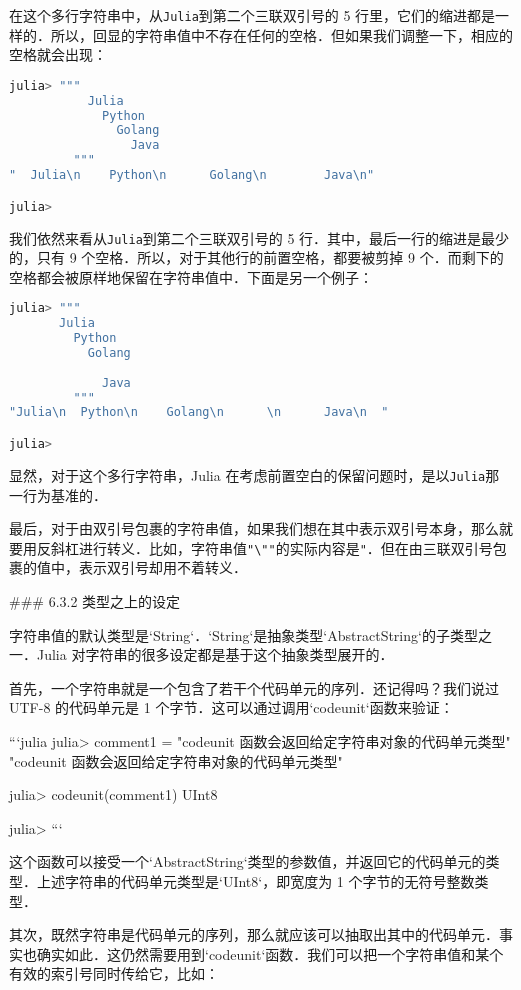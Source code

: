 在这个多行字符串中，从\verb|Julia|到第二个三联双引号的 5 行里，它们的缩进都是一样的．所以，回显的字符串值中不存在任何的空格．但如果我们调整一下，相应的空格就会出现：
\begin{lstlisting}[language=julia]
julia> """
           Julia
             Python
               Golang
                 Java
         """
"  Julia\n    Python\n      Golang\n        Java\n"

julia> 
\end{lstlisting}

我们依然来看从\verb|Julia|到第二个三联双引号的 5 行．其中，最后一行的缩进是最少的，只有 9 个空格．所以，对于其他行的前置空格，都要被剪掉 9 个．而剩下的空格都会被原样地保留在字符串值中．下面是另一个例子：
\begin{lstlisting}[language=julia]
julia> """
       Julia
         Python
           Golang
             
             Java
         """
"Julia\n  Python\n    Golang\n      \n      Java\n  "

julia> 
\end{lstlisting}

显然，对于这个多行字符串，Julia 在考虑前置空白的保留问题时，是以\verb|Julia|那一行为基准的．

最后，对于由双引号包裹的字符串值，如果我们想在其中表示双引号本身，那么就要用反斜杠进行转义．比如，字符串值\verb|"\""|的实际内容是\verb|"|．但在由三联双引号包裹的值中，表示双引号却用不着转义．

### 6.3.2 类型之上的设定

字符串值的默认类型是`String`．`String`是抽象类型`AbstractString`的子类型之一．Julia 对字符串的很多设定都是基于这个抽象类型展开的．

首先，一个字符串就是一个包含了若干个代码单元的序列．还记得吗？我们说过 UTF-8 的代码单元是 1 个字节．这可以通过调用`codeunit`函数来验证：

```julia
julia> comment1 = "codeunit 函数会返回给定字符串对象的代码单元类型"
"codeunit 函数会返回给定字符串对象的代码单元类型"

julia> codeunit(comment1)
UInt8

julia> 
```

这个函数可以接受一个`AbstractString`类型的参数值，并返回它的代码单元的类型．上述字符串的代码单元类型是`UInt8`，即宽度为 1 个字节的无符号整数类型．

其次，既然字符串是代码单元的序列，那么就应该可以抽取出其中的代码单元．事实也确实如此．这仍然需要用到`codeunit`函数．我们可以把一个字符串值和某个有效的索引号同时传给它，比如：

